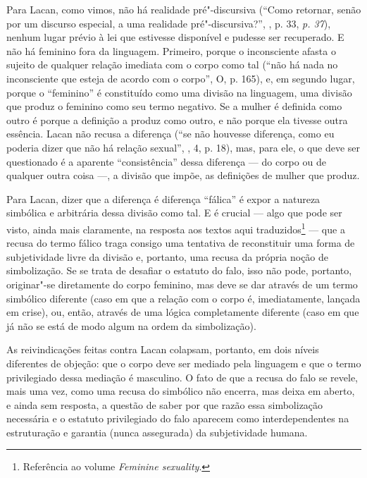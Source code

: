 Para Lacan, como vimos, não há realidade pré"-discursiva (``Como
retornar, senão por um discurso especial, a uma realidade
pré"-discursiva?'', , p. 33, \emph{p. 37}), nenhum lugar prévio à lei
que estivesse disponível e pudesse ser recuperado. E não há feminino
fora da linguagem. Primeiro, porque o inconsciente afasta o sujeito de
qualquer relação imediata com o corpo como tal (``não há nada no
inconsciente que esteja de acordo com o corpo'', O, p. 165), e, em
segundo lugar, porque o ``feminino'' é constituído como uma divisão na
linguagem, uma divisão que produz o feminino como seu termo negativo. Se
a mulher é definida como outro é porque a definição a produz como outro,
e não porque ela tivesse outra essência. Lacan não recusa a diferença
(``se não houvesse diferença, como eu poderia dizer que não há relação
sexual'', , 4, p. 18), mas, para ele, o que deve ser questionado é a
aparente ``consistência'' dessa diferença --- do corpo ou de qualquer
outra coisa ---, a divisão que impõe, as definições de mulher que produz.

Para Lacan, dizer que a diferença é diferença ``fálica'' é expor a
natureza simbólica e arbitrária dessa divisão como tal. E é crucial ---
algo que pode ser visto, ainda mais claramente, na resposta aos textos
aqui traduzidos\footnote{Referência ao volume \emph{Feminine sexuality}.}
--- que a recusa do termo fálico traga consigo uma tentativa de
reconstituir uma forma de subjetividade livre da divisão e, portanto,
uma recusa da própria noção de simbolização. Se se trata de desafiar o
estatuto do falo, isso não pode, portanto, originar"-se diretamente do
corpo feminino, mas deve se dar através de um termo simbólico diferente
(caso em que a relação com o corpo é, imediatamente, lançada em crise),
ou, então, através de uma lógica completamente diferente (caso em que já
não se está de modo algum na ordem da simbolização).

As reivindicações feitas contra Lacan colapsam, portanto, em dois níveis
diferentes de objeção: que o corpo deve ser mediado pela linguagem e que
o termo privilegiado dessa mediação é masculino. O fato de que a recusa
do falo se revele, mais uma vez, como uma recusa do simbólico não
encerra, mas deixa em aberto, e ainda sem resposta, a questão de saber
por que razão essa simbolização necessária e o estatuto privilegiado do
falo aparecem como interdependentes na estruturação e garantia (nunca
assegurada) da subjetividade humana.

